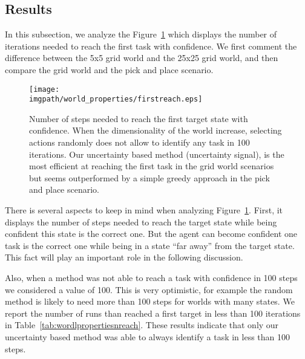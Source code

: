 \subsection{Results}

In this subsection, we analyze the Figure~\ref{fig:wordlpropertiestimefirst} which displays the number of iterations needed to reach the first task with confidence. We first comment the difference between the 5x5 grid world and the 25x25 grid world, and then compare the grid world and the pick and place scenario.

\begin{figure}[!htbp]
\centering
\texttt{[image: \\imgpath/world\_properties/firstreach.eps]}
\caption{Number of steps needed to reach the first target state with confidence. When the dimensionality of the world increase, selecting actions randomly does not allow to identify any task in 100 iterations. Our uncertainty based method (uncertainty signal), is the most efficient at reaching the first task in the grid world scenarios but seems outperformed by a simple greedy approach in the pick and place scenario.}
\label{fig:wordlpropertiestimefirst}
\end{figure}

There is several aspects to keep in mind when analyzing Figure~\ref{fig:wordlpropertiestimefirst}. First, it displays the number of steps needed to reach the target state while being confident this state is the correct one. But the agent can become confident one task is the correct one while being in a state ``far away'' from the target state. 
This fact will play an important role in the following discussion.

Also, when a method was not able to reach a task with confidence in 100 steps we considered a value of 100. This is very optimistic, for example the random method is likely to need more than 100 steps for worlds with many states. We report the number of runs than reached a first target in less than 100 iterations in Table~\ref{tab:wordlpropertiesnreach}. These results indicate that only our uncertainty based method was able to always identify a task in less than 100 steps.

